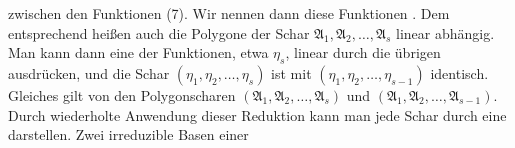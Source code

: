 zwischen den Funktionen (7). Wir nennen dann diese Funktionen
. Dem entsprechend heißen auch die Polygone
der Schar $\mathfrak{A}_1, \mathfrak{A}_2, \ldots, \mathfrak{A}_s$ linear abhängig. Man kann dann eine
der Funktionen, etwa $\eta_s$, linear durch die übrigen ausdrücken,
und die Schar $(\eta_1, \eta_2, \ldots, \eta_s)$ ist mit $(\eta_1, \eta_2, \ldots, \eta_{s-1})$ identisch.
Gleiches gilt von den Polygonscharen $(\mathfrak{A}_1, \mathfrak{A}_2, \ldots, \mathfrak{A}_s)$ und $(\mathfrak{A}_1,
\mathfrak{A}_2, \ldots, \mathfrak{A}_{s-1})$. Durch wiederholte Anwendung dieser Reduktion
kann man jede Schar durch eine  darstellen. Zwei irreduzible Basen einer
